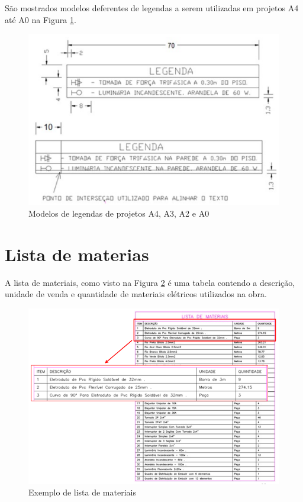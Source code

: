 \documentclass{article}
\begin{document}
\hspace{1cm} São mostrados modelos deferentes de legendas a serem utilizadas em projetos A4 até A0 na Figura \ref{fig_ModelosLegendaA4ateA0}.

\begin{figure} [H] %
\centering
\includegraphics[scale=0.7]{Fig/Figura_ModelosDeLegendasA4ateA0.png} 
\caption{Modelos de legendas de projetos A4, A3, A2 e A0}
\label{fig_ModelosLegendaA4ateA0}
\end{figure}

\section{Lista de materias}

\hspace{1cm} A lista de materiais, como visto na Figura \ref{fig_ListaMateriais} é uma tabela contendo a descrição, unidade de venda e quantidade de materiais elétricos utilizados na obra.

\begin{figure} [H] %
\centering
\includegraphics[scale=0.65]{Fig/Figura_ListaDeMateriais.png} 
\caption{Exemplo de lista de materiais}
\label{fig_ListaMateriais}
\end{figure}
\end{document}
